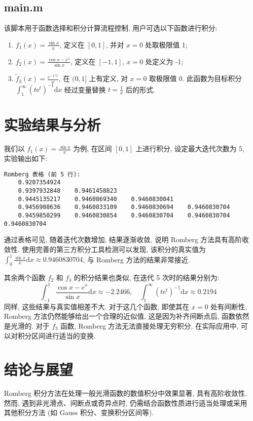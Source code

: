 \documentclass[12pt]{article}
\begin{document}
	\subsection{main.m}
		该脚本用于函数选择和积分计算流程控制, 用户可选以下函数进行积分:

		\begin{enumerate}
			\item $f_{1}\left(x\right) = \frac{\sin x}{x}$, 定义在 $[0,1]$, 并对 $x=0$ 处取极限值 1;
			\item $f_{2}\left(x\right) = \frac{\cos x - e^x}{\sin x}$, 定义在 $[-1,1]$, $x=0$ 处定义为 -1;
			\item $\widetilde{f}_{3}(x) = \frac{e^{-1/x}}{x}$, 在 $(0,1]$ 上有定义, 对 $x=0$ 取极限值 0. 此函数为目标积分 $\int_{1}^{\infty}\left(t\text{e}^{t}\right)^{-1} \text{d}x$ 经过变量替换 $t = \frac{1}{x}$ 后的形式.
		\end{enumerate}

	\section{实验结果与分析}
		我们以 $f_1(x) = \frac{\sin x}{x}$ 为例, 在区间 $[0,1]$ 上进行积分, 设定最大迭代次数为 5, 实验输出如下:

\begin{verbatim}
Romberg 表格 (前 5 行): 
	0.9207354924 
	0.9397932848	0.9461458823 
	0.9445135217	0.9460869340	0.9460830041 
	0.9456908636	0.9460833109	0.9460830694	0.9460830704 
	0.9459850299	0.9460830854	0.9460830704	0.9460830704	0.9460830704
\end{verbatim}

		通过表格可见, 随着迭代次数增加, 结果逐渐收敛, 说明 Romberg 方法具有高阶收敛性. 使用完善的第三方积分工具检测可以发现, 该积分的真实值为 $\int_{0}^{1}\frac{\sin x}{x} \text{d}x \approx 0.9460830704$, 与 Romberg 方法的结果非常接近.

		其余两个函数 $f_2$ 和 $f_3$ 的积分结果也类似, 在迭代 5 次时的结果分别为:
		\begin{equation*}
			\int_{-1}^{1}\frac{\cos x - e^x}{\sin x} \text{d}x \approx -2.2466, \quad \int_{1}^{\infty}\left(t\text{e}^{t}\right)^{-1} \text{d}x \approx 0.2194
		\end{equation*}
		同样, 这些结果与真实值相差不大. 对于这几个函数, 即使其在 $x=0$ 处有间断性, Romberg 方法仍然能够给出一个合理的近似值, 这是因为补齐间断点后, 函数依然是光滑的. 对于 $f_3$ 函数, Romberg 方法无法直接处理无穷积分, 在实际应用中, 可以对积分区间进行适当的变换.

	\section{结论与展望}
		Romberg 积分方法在处理一般光滑函数的数值积分中效果显著, 具有高阶收敛性. 然而, 遇到非光滑点、间断点或奇异点时, 仍需结合函数性质进行适当处理或采用其他积分方法 (如 Gauss 积分、变换积分区间等).
\end{document}

